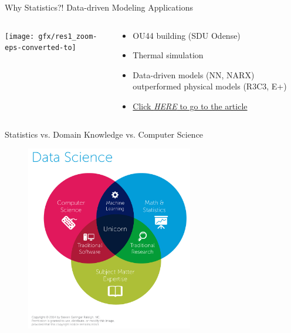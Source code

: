 \begin{frame}{Why Statistics?! Data-driven Modeling Applications}
    \begin{columns}
    \begin{column}{0.5\linewidth}
        \texttt{[image: gfx/res1\_zoom-eps-converted-to]}
    \end{column}        
    \begin{column}{0.5\linewidth}
        \begin{itemize}
            \item OU44 building (SDU Odense)
            \item Thermal simulation
            \item Data-driven models (NN, NARX) outperformed physical models (R3C3, E+)
            \item \href{http://findresearcher.sdu.dk/portal/da/publications/comparative-analysis-of-white-gray-and-blackbox-models-for-thermal-simulation-of-indoor-environment-teaching-building-case-study(925c0fc9-7b0a-4689-a5bb-e6ec3a69f29b).html}{Click \emph{HERE} to go to the article}
        \end{itemize}
    \end{column}    
    \end{columns}
    
\end{frame}

\begin{frame}{Statistics vs. Domain Knowledge vs. Computer Science}
    \begin{figure}
    \includegraphics[width=0.65\textwidth]{gfx/web/data-science-venn-diagram}
    \end{figure}
\end{frame}

